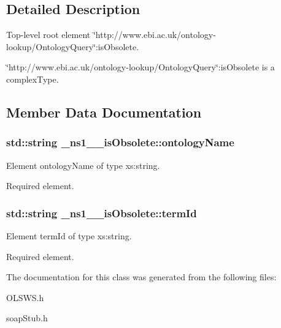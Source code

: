 \subsection{Detailed Description}
Top-\/level root element \char`\"{}http://www.ebi.ac.uk/ontology-\/lookup/OntologyQuery\char`\"{}:isObsolete. 

\char`\"{}http://www.ebi.ac.uk/ontology-\/lookup/OntologyQuery\char`\"{}:isObsolete is a complexType. 

\subsection{Member Data Documentation}
\hypertarget{class__ns1____isObsolete_aaaa439bfa9c95f7b3a6742a7b63b5fd2}{
\subsubsection[{ontologyName}]{\setlength{\rightskip}{0pt plus 5cm}std::string {\bf \_\-ns1\_\-\_\-isObsolete::ontologyName}}}
\label{class__ns1____isObsolete_aaaa439bfa9c95f7b3a6742a7b63b5fd2}


Element ontologyName of type xs:string. 

Required element. \hypertarget{class__ns1____isObsolete_a66347d6b9ed4732f844146f3e57dac64}{
\subsubsection[{termId}]{\setlength{\rightskip}{0pt plus 5cm}std::string {\bf \_\-ns1\_\-\_\-isObsolete::termId}}}
\label{class__ns1____isObsolete_a66347d6b9ed4732f844146f3e57dac64}


Element termId of type xs:string. 

Required element. 

The documentation for this class was generated from the following files:\begin{DoxyCompactItemize}
\item 
OLSWS.h\item 
soapStub.h\end{DoxyCompactItemize}
